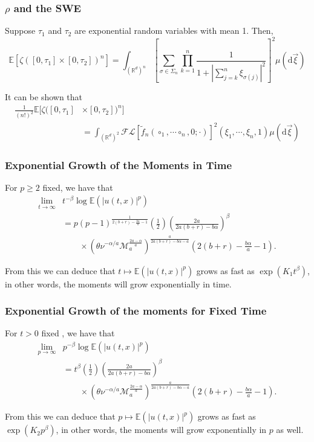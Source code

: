 \documentclass{beamer}%
\numberwithin{equation}{section}
\newcommand{\R}{\mathbb{R}}
\newcommand{\E}{\mathbb{E}}
\newcommand{\ud}{\ensuremath{\mathrm{d} }}
\begin{document}
		\begin{frame}[t]
		\frametitle{$\rho$ and the SWE}
	\begin{theorem}[X. Chen]
		Suppose $\tau_1$ and $\tau_2$ are exponential random variables with mean 1. Then,
		\[
		\mathbb{E}\left[ \zeta\left([0,\tau_1] \times [0,\tau_2]\right)^n \right] = \int_{(\R^{d})^n} \left[ \sum_{\sigma \in \Sigma_n} \prod_{k=1}^n \frac{1}{ 1 + \left| \sum_{j=k}^n  \xi_{\sigma(j)} \right|^2 } \right]^2 \mu(\ud \vec{\xi})
		\]
	\end{theorem}
It can be shown that
	\begin{align*}
		\frac{1}{(n!)^2}\mathbb{E}[ \zeta ( [0,\tau_1]  &\times [0,\tau_2] )^n ]
		\\ &= \int_{(\R^d)^2} \mathcal{F}\mathcal{L}\left[\tilde{f}_n(\circ_1,\cdots\circ_n,0;\cdot)\right]^2(\xi_1, \cdots,\xi_n,1) \mu(\ud \vec{\xi})
	\end{align*}

	\end{frame}

	\begin{frame}[t]
		\frametitle{Exponential Growth of the Moments in Time}
		\begin{theorem} For $p \ge 2$ fixed, we have that
			\begin{align*}
			\lim_{t \to \infty} & t^{-\beta} \log \E\left(|u(t,x)|^p\right)
			\\&=  p(p-1)^{\frac{1}{2(b+r)-\frac{b\alpha}{a} -1}} \left(\frac{1}{2}\right)\left(\frac{2a}{2a(b+r)- b\alpha} \right)^\beta \\
			& \quad \quad \times \left(\theta\nu^{-\alpha/a} \mathcal{M}_a^{\frac{2a-\alpha}{a}}\right)^{\frac{a}{2a(b+r)-b\alpha-a}}\left(2(b+r)-\frac{b\alpha}{a}-1\right).
			\end{align*}
		\end{theorem}
From this we can deduce that $t \mapsto \mathbb{E}(|u(t,x)|^p)$ grows as fast as $\exp\left({K_1 t^\beta }\right)$, in other words, the moments will grow exponentially in time.


	\end{frame}

		\begin{frame}[t]
		\frametitle{Exponential Growth of the moments for Fixed Time}
		\begin{theorem} For $t>0$ fixed , we have that
			\begin{align*}
	\lim_{p \to \infty} &  p^{-\beta} \log \E\left(|u(t,x)|^p\right)
	\\ &=  t^\beta \left(\frac{1}{2}\right)\left(\frac{2a}{2a(b+r)- b\alpha} \right)^\beta \\
	& \quad \quad \times \left(\theta\nu^{-\alpha/a} \mathcal{M}_a^{\frac{2a-\alpha}{a}}\right)^{\frac{a}{2a(b+r)-b\alpha-a}}\left(2(b+r)-\frac{b\alpha}{a}-1\right).
	\end{align*}
			\end{theorem}
From this we can deduce that $p \mapsto \mathbb{E}(|u(t,x)|^p)$ grows as fast as $\exp\left({K_2 p^\beta }\right)$, in other words, the moments will grow exponentially in $p$ as well.

		\end{frame}
\end{document}
